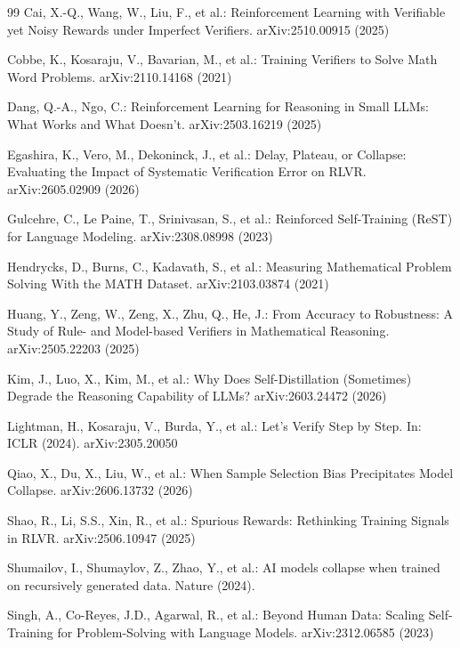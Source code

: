 \documentclass[runningheads]{llncs}
\begin{document}
\begin{thebibliography}{99}
Cai, X.-Q., Wang, W., Liu, F., et al.:
Reinforcement Learning with Verifiable yet Noisy Rewards under Imperfect
Verifiers. arXiv:2510.00915 (2025)

Cobbe, K., Kosaraju, V., Bavarian, M., et al.:
Training Verifiers to Solve Math Word Problems. arXiv:2110.14168 (2021)

Dang, Q.-A., Ngo, C.: Reinforcement Learning for Reasoning in Small LLMs: What
Works and What Doesn't. arXiv:2503.16219 (2025)

Egashira, K., Vero, M., Dekoninck, J., et al.: Delay, Plateau, or Collapse: Evaluating the Impact of Systematic
Verification Error on RLVR. arXiv:2605.02909 (2026)

Gulcehre, C., Le Paine, T., Srinivasan, S., et al.: Reinforced
Self-Training (ReST) for Language Modeling. arXiv:2308.08998 (2023)

Hendrycks, D., Burns, C., Kadavath, S., et al.: Measuring Mathematical Problem Solving With the
MATH Dataset. arXiv:2103.03874 (2021)

Huang, Y., Zeng, W., Zeng, X., Zhu, Q., He, J.: From Accuracy to
Robustness: A Study of Rule- and Model-based Verifiers in Mathematical
Reasoning. arXiv:2505.22203 (2025)

Kim, J., Luo, X., Kim, M., et al.:
Why Does Self-Distillation (Sometimes) Degrade the Reasoning Capability of
LLMs? arXiv:2603.24472 (2026)

Lightman, H., Kosaraju, V., Burda, Y., et al.: Let's Verify Step by Step. In: ICLR (2024).
arXiv:2305.20050

Qiao, X., Du, X., Liu, W., et al.:
When Sample Selection Bias Precipitates Model Collapse. arXiv:2606.13732
(2026)

Shao, R., Li, S.S., Xin, R., et al.: Spurious Rewards: Rethinking Training Signals in RLVR.
arXiv:2506.10947 (2025)

Shumailov, I., Shumaylov, Z., Zhao, Y., et al.: AI models collapse when trained on recursively generated data. Nature
(2024). 

Singh, A., Co-Reyes, J.D., Agarwal, R., et al.: Beyond Human Data: Scaling
Self-Training for Problem-Solving with Language Models. arXiv:2312.06585
(2023)


\end{thebibliography}
\end{document}
